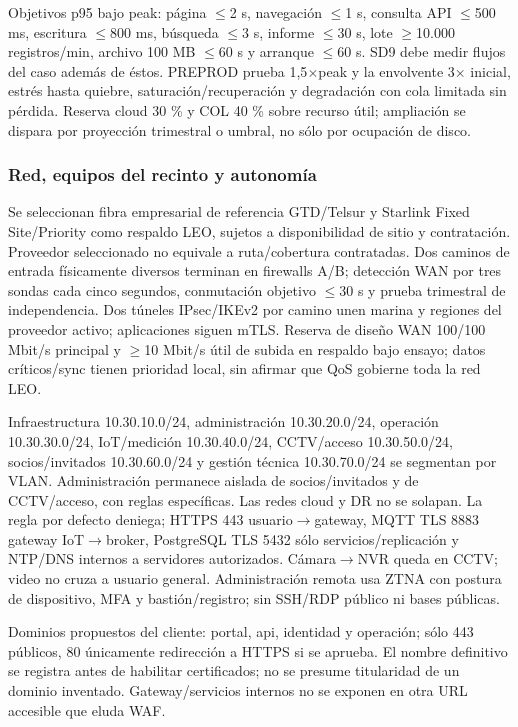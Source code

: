 \documentclass[11pt,letterpaper]{report}
\begin{document}
Objetivos p95 bajo peak: página $\leq$2 s, navegación $\leq$1 s, consulta API $\leq$500 ms, escritura $\leq$800 ms, búsqueda $\leq$3 s, informe $\leq$30 s, lote $\geq$10.000 registros/min, archivo 100 MB $\leq$60 s y arranque $\leq$60 s. SD9 debe medir flujos del caso además de éstos. PREPROD prueba 1,5$\times$peak y la envolvente 3$\times$ inicial, estrés hasta quiebre, saturación/recuperación y degradación con cola limitada sin pérdida. Reserva cloud 30 \% y COL 40 \% sobre recurso útil; ampliación se dispara por proyección trimestral o umbral, no sólo por ocupación de disco.

\subsubsection*{Red, equipos del recinto y autonomía}
Se seleccionan fibra empresarial de referencia GTD/Telsur y Starlink Fixed Site/Priority como respaldo LEO, sujetos a disponibilidad de sitio y contratación. Proveedor seleccionado no equivale a ruta/cobertura contratadas. Dos caminos de entrada físicamente diversos terminan en firewalls A/B; detección WAN por tres sondas cada cinco segundos, conmutación objetivo $\leq$30 s y prueba trimestral de independencia. Dos túneles IPsec/IKEv2 por camino unen marina y regiones del proveedor activo; aplicaciones siguen mTLS. Reserva de diseño WAN 100/100 Mbit/s principal y $\geq$10 Mbit/s útil de subida en respaldo bajo ensayo; datos críticos/sync tienen prioridad local, sin afirmar que QoS gobierne toda la red LEO.

Infraestructura 10.30.10.0/24, administración 10.30.20.0/24, operación 10.30.30.0/24, IoT/medición 10.30.40.0/24, CCTV/acceso 10.30.50.0/24, socios/invitados 10.30.60.0/24 y gestión técnica 10.30.70.0/24 se segmentan por VLAN. Administración permanece aislada de socios/invitados y de CCTV/acceso, con reglas específicas. Las redes cloud y DR no se solapan. La regla por defecto deniega; HTTPS 443 usuario$\rightarrow$gateway, MQTT TLS 8883 gateway IoT$\rightarrow$broker, PostgreSQL TLS 5432 sólo servicios/replicación y NTP/DNS internos a servidores autorizados. Cámara$\rightarrow$NVR queda en CCTV; video no cruza a usuario general. Administración remota usa ZTNA con postura de dispositivo, MFA y bastión/registro; sin SSH/RDP público ni bases públicas.

Dominios propuestos del cliente: portal, api, identidad y operación; sólo 443 públicos, 80 únicamente redirección a HTTPS si se aprueba. El nombre definitivo se registra antes de habilitar certificados; no se presume titularidad de un dominio inventado. Gateway/servicios internos no se exponen en otra URL accesible que eluda WAF.
\end{document}
